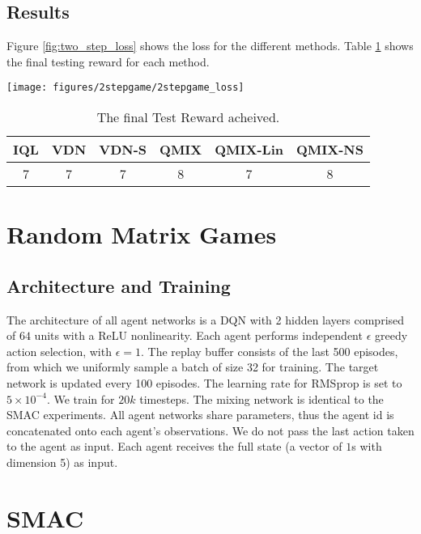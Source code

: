 \documentclass[twoside,11pt]{article}
\begin{document}
\subsection{Results}

Figure \ref{fig:two_step_loss} shows the loss for the different methods. Table \ref{table:final_test_two_step} shows the final testing reward for each method.

\begin{figure*}[htb!]
    \centering
    \texttt{[image: figures/2stepgame/2stepgame\_loss]}
    \caption{Loss for all six methods on the Two Step Game. The mean and 95\% confidence interval is shown across 30 independent runs.}
    \label{fig:two_step_loss}
\end{figure*}

\begin{table}[h]
	\setlength{\extrarowheight}{3pt}
	\centering
    \begin{center}
        \begin{tabular}{|c| c | c | c | c | c |}
        \hline
        \textbf{IQL} & \textbf{VDN} & \textbf{VDN-S} & \textbf{QMIX} & \textbf{QMIX-Lin} & \textbf{QMIX-NS} \\
        \hline
        7 & 7 & 7 & 8 & 7 & 8 \\
        \hline
        \end{tabular}
    \end{center}
    \caption{The final Test Reward acheived.}
    \label{table:final_test_two_step}
\end{table}
 \section{Random Matrix Games} 
\label{sec:rnd_matrix_setup}

\subsection{Architecture and Training}

The architecture of all agent networks is a DQN with 2 hidden layers comprised of $64$ units with a ReLU nonlinearity. Each agent performs independent $\epsilon$ greedy action selection, with $\epsilon=1$. 
The replay buffer consists of the last 500 episodes, from which we uniformly sample a batch of size 32 for training. The target network is updated every 100 episodes. The learning rate for RMSprop is set to $5 \times 10^{-4}$. We train for $20k$ timesteps. 
The mixing network is identical to the SMAC experiments. 
All agent networks share parameters, thus the agent id is concatenated onto each agent's observations. We do not pass the last action taken to the agent as input. Each agent receives the full state (a vector of $1$s with dimension 5) as input. \section{SMAC}\label{appendix:SMAC}
\end{document}
